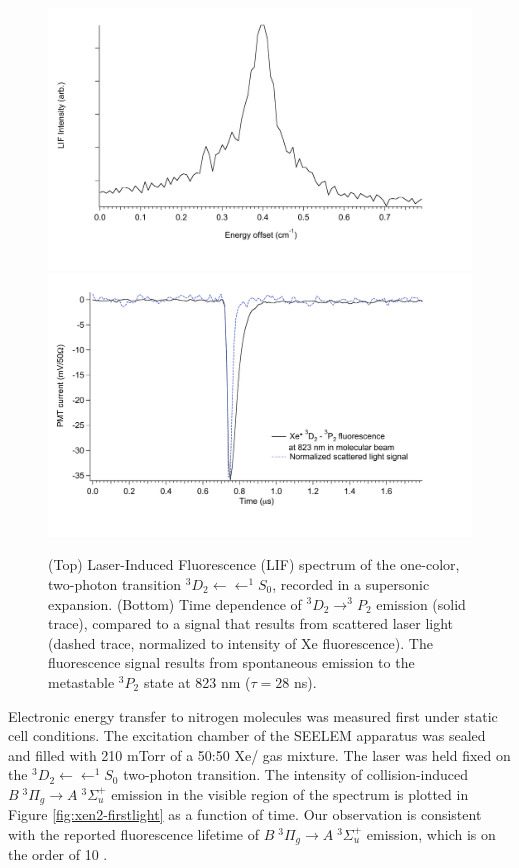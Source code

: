 \begin{figure}
  \caption{(Top) Laser-Induced Fluorescence (LIF) spectrum of the
    one-color, two-photon transition  $^3D_2 \leftarrow
    \leftarrow ^1S_0$, recorded in a supersonic expansion.  (Bottom)
    Time dependence of  $^3D_2 \rightarrow ^3P_2$ emission
    (solid trace), compared to a signal that results from scattered
    laser light (dashed trace, normalized to intensity of Xe
    fluorescence). The fluorescence signal results from spontaneous
    emission to the metastable $^3P_2$ state at 823 nm ($\tau = 28$
    ns).}
  \label{fig:xe-beam}
  \centering
  \includegraphics[width=6in]{Xe-beamlif-060406-int.pdf}
  \includegraphics[width=6in]{Xe-beamtrc-060406.pdf}
\end{figure}

Electronic energy transfer to nitrogen molecules was measured first
under static cell conditions.  The excitation chamber of the SEELEM
apparatus was sealed and filled with 210 mTorr of a 50:50 Xe/
gas mixture.  The laser was held fixed on the  $^3D_2
\leftarrow \leftarrow ^1S_0$ two-photon transition.  The intensity of
collision-induced  $B \; ^3\Pi_g \rightarrow A \; ^3\Sigma_u^+$
emission in the visible region of the spectrum is plotted in Figure
\ref{fig:xen2-firstlight} as a function of time.  Our observation is
consistent with the reported fluorescence lifetime of  $B \;
^3\Pi_g \rightarrow A \; ^3\Sigma_u^+$ emission, which is on the order
of 10 \microsec.


